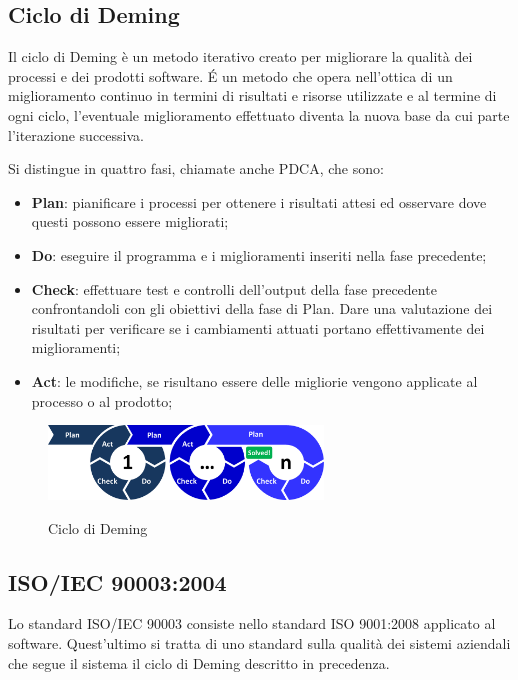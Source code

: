 	\subsection{Ciclo di Deming}
	Il ciclo di Deming è un metodo iterativo creato per migliorare la qualità dei processi e dei prodotti software. \'E un metodo che opera nell'ottica di un miglioramento continuo in termini di risultati e risorse utilizzate e al termine di ogni ciclo, l'eventuale miglioramento effettuato diventa la nuova base da cui parte l'iterazione successiva.
	
	Si distingue in quattro fasi, chiamate anche PDCA, che sono:
	
	\begin{itemize}
		\item \textbf{Plan}: pianificare i processi per ottenere i risultati attesi ed osservare dove questi possono essere migliorati;
		\item \textbf{Do}: eseguire il programma e i miglioramenti inseriti nella fase precedente;
		\item \textbf{Check}: effettuare test e controlli dell'output della fase precedente confrontandoli con gli obiettivi della fase di Plan. Dare una valutazione dei risultati per verificare se i cambiamenti attuati portano effettivamente dei miglioramenti;
		\item \textbf{Act}: le modifiche, se risultano essere delle migliorie vengono applicate al processo o al prodotto;
	\end{itemize}

	\begin{figure}[H]
		\centering
		\includegraphics[width=0.65\textwidth]{img/PDCA}
		\label{fig:PDCA}
		\caption[Ciclo di Deming]{Ciclo di Deming \protect\footnotemark}
	\end{figure}


	\subsection{ISO/IEC 90003:2004}
	Lo standard ISO/IEC 90003 consiste nello standard ISO 9001:2008 applicato al software. Quest'ultimo si tratta di uno standard sulla qualità dei sistemi aziendali che segue il sistema il ciclo di Deming descritto in precedenza.
	
